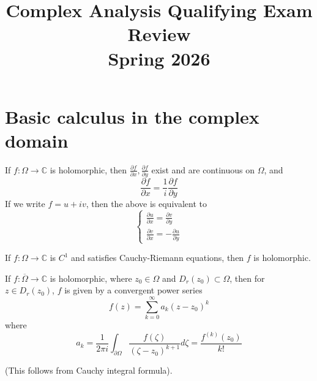 \documentclass[openany]{book}
\title{Complex Analysis Qualifying Exam Review
\\ 
\vspace{0.4cm}
\large Spring 2026}
\newcommand{\C}{\mathbb{C}}
\begin{document}
\maketitle

\tableofcontents
\newpage



\chapter{Basic calculus in the complex domain}

\begin{prop}
    If $f:\Omega\to\C$ is holomorphic, then $\frac{\partial f}{\partial x}, \frac{\partial f}{\partial y}$ exist and are continuous on $\Omega$, and 
    \begin{equation*}
        \frac{\partial f}{\partial x}=\frac{1}{i}\frac{\partial f}{\partial y}
    \end{equation*}
    If we write $f=u+iv$, then the above is equivalent to 
    \begin{equation*}
        \begin{cases}
            \frac{\partial u}{\partial x}=\frac{\partial v}{\partial y}\\
            \frac{\partial v}{\partial x}=-\frac{\partial u}{\partial y}
        \end{cases}
    \end{equation*}
\end{prop}

\begin{prop}
    If $f:\Omega\to\C$ is $C^1$ and satisfies Cauchy-Riemann equations, then $f$ is holomorphic.
\end{prop}

\begin{prop}
    If $f:\overline{\Omega}\to\C$ is holomorphic, where $z_0\in\Omega$ and $D_r(z_0)\subset\Omega$, then for $z\in D_r(z_0)$, $f$ is given by a convergent power series 
    \begin{equation*}
        f(z)=\sum_{k=0}^\infty a_k(z-z_0)^k
    \end{equation*}
    where 
    \begin{equation*}
        a_k=\frac{1}{2\pi i}\int_{\partial\Omega}\frac{f(\zeta)}{(\zeta-z_0)^{k+1}}d\zeta=\frac{f^{(k)}(z_0)}{k!}
    \end{equation*}
\end{prop}
(This follows from Cauchy integral formula).
\end{document}

